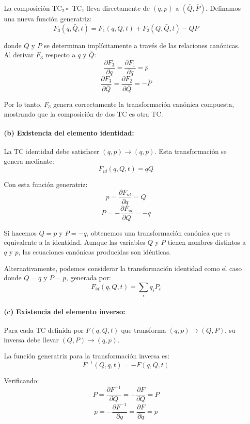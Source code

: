 \documentclass[12pt]{article}
\begin{document}
\begin{enumerate}
  La composición TC$_2 \circ$ TC$_1$ lleva directamente de $(q,p)$ a $(\bar{Q},\bar{P})$. Definamos una nueva función generatriz:
  \[
  F_3(q,\bar{Q},t) = F_1(q,Q,t) + F_2(Q,\bar{Q},t) - QP
  \]

  donde $Q$ y $P$ se determinan implícitamente a través de las relaciones canónicas. Al derivar $F_3$ respecto a $q$ y $\bar{Q}$:
  \[
  \frac{\partial F_3}{\partial q} = \frac{\partial F_1}{\partial q} = p
  \]
  \[
  \frac{\partial F_3}{\partial \bar{Q}} = \frac{\partial F_2}{\partial \bar{Q}} = -\bar{P}
  \]

  Por lo tanto, $F_3$ genera correctamente la transformación canónica compuesta, mostrando que la composición de dos TC es otra TC.

  \paragraph{(b) Existencia del elemento identidad:}

  La TC identidad debe satisfacer $(q,p) \to (q,p)$. Esta transformación se genera mediante:
  \[
  F_{id}(q,Q,t) = qQ
  \]

  Con esta función generatriz:
  \[
  p = \frac{\partial F_{id}}{\partial q} = Q
  \]
  \[
  P = -\frac{\partial F_{id}}{\partial Q} = -q
  \]

  Si hacemos $Q = p$ y $P = -q$, obtenemos una transformación canónica que es equivalente a la identidad. Aunque las variables $Q$ y $P$ tienen nombres distintos a $q$ y $p$, las ecuaciones canónicas producidas son idénticas.

  Alternativamente, podemos considerar la transformación identidad como el caso donde $Q = q$ y $P = p$, generada por:
  \[
  F_{id}(q,Q,t) = \sum_i q_iP_i
  \]

  \paragraph{(c) Existencia del elemento inverso:}

  Para cada TC definida por $F(q,Q,t)$ que transforma $(q,p) \to (Q,P)$, su inversa debe llevar $(Q,P) \to (q,p)$.

  La función generatriz para la transformación inversa es:
  \[
  F^{-1}(Q,q,t) = -F(q,Q,t)
  \]

  Verificando:
  \[
  P = \frac{\partial F^{-1}}{\partial Q} = -\frac{\partial F}{\partial Q} = P
  \]
  \[
  p = -\frac{\partial F^{-1}}{\partial q} = \frac{\partial F}{\partial q} = p
  \]


\end{enumerate}
\end{document}
